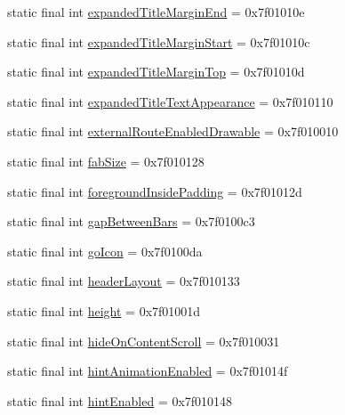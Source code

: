 \begin{CompactItemize}
\item 
static final int \hyperlink{classandroid_1_1support_1_1coreutils_1_1_r_1_1attr_3a642219012cb860c1ce5f79e2c25fea}{expandedTitleMarginEnd} = 0x7f01010e
\item 
static final int \hyperlink{classandroid_1_1support_1_1coreutils_1_1_r_1_1attr_50baef19e96f14f616342573881a4268}{expandedTitleMarginStart} = 0x7f01010c
\item 
static final int \hyperlink{classandroid_1_1support_1_1coreutils_1_1_r_1_1attr_1616a80512abe6381ea59fd5eb53cf1e}{expandedTitleMarginTop} = 0x7f01010d
\item 
static final int \hyperlink{classandroid_1_1support_1_1coreutils_1_1_r_1_1attr_d9d6c8fdcb8dc12de60cb94fff9b8c97}{expandedTitleTextAppearance} = 0x7f010110
\item 
static final int \hyperlink{classandroid_1_1support_1_1coreutils_1_1_r_1_1attr_31795c4ad64123e21a3b3d10bc989340}{externalRouteEnabledDrawable} = 0x7f010010
\item 
static final int \hyperlink{classandroid_1_1support_1_1coreutils_1_1_r_1_1attr_a4b2a494261ee51c15294377653073ff}{fabSize} = 0x7f010128
\item 
static final int \hyperlink{classandroid_1_1support_1_1coreutils_1_1_r_1_1attr_5d9efed6832c1ef560faae0f018cb51e}{foregroundInsidePadding} = 0x7f01012d
\item 
static final int \hyperlink{classandroid_1_1support_1_1coreutils_1_1_r_1_1attr_387aafc8cc5a6e4f98bfead340496098}{gapBetweenBars} = 0x7f0100c3
\item 
static final int \hyperlink{classandroid_1_1support_1_1coreutils_1_1_r_1_1attr_f78015b53dcea0b88ea68130f3258f1e}{goIcon} = 0x7f0100da
\item 
static final int \hyperlink{classandroid_1_1support_1_1coreutils_1_1_r_1_1attr_6b7b94d4882de6db97ac508fbdb88000}{headerLayout} = 0x7f010133
\item 
static final int \hyperlink{classandroid_1_1support_1_1coreutils_1_1_r_1_1attr_b14cb74f24ea74f53c00b4eae40e614b}{height} = 0x7f01001d
\item 
static final int \hyperlink{classandroid_1_1support_1_1coreutils_1_1_r_1_1attr_b1b660a38328fed9fa303b46799ed85a}{hideOnContentScroll} = 0x7f010031
\item 
static final int \hyperlink{classandroid_1_1support_1_1coreutils_1_1_r_1_1attr_ede6fabe0b42d8f353256b4316290e18}{hintAnimationEnabled} = 0x7f01014f
\item 
static final int \hyperlink{classandroid_1_1support_1_1coreutils_1_1_r_1_1attr_e741f6fc45980f254ae7fd6b56a280c8}{hintEnabled} = 0x7f010148

\end{CompactItemize}
